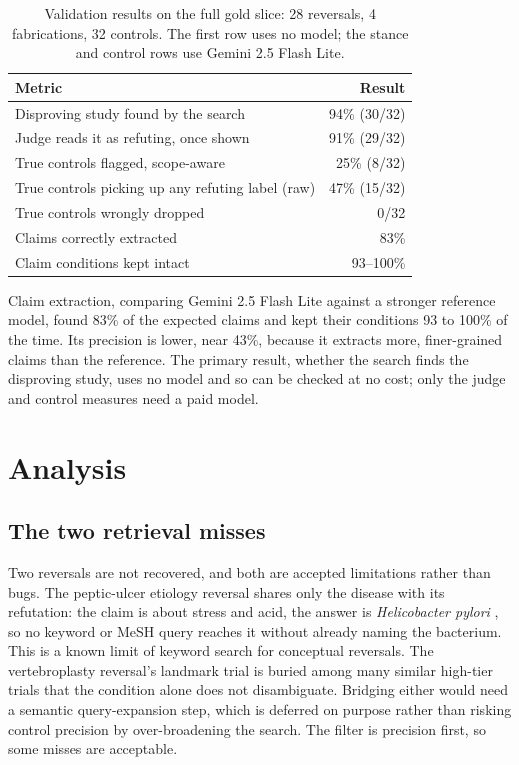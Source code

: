 \documentclass[11pt,a4paper]{article}
\begin{document}
\begin{table}[h]
\centering
\begin{tabular}{lr}
\toprule
\textbf{Metric} & \textbf{Result} \\
\midrule
Disproving study found by the search & 94\% (30/32) \\
Judge reads it as refuting, once shown & 91\% (29/32) \\
True controls flagged, scope-aware & 25\% (8/32) \\
True controls picking up any refuting label (raw) & 47\% (15/32) \\
True controls wrongly dropped & 0/32 \\
Claims correctly extracted & 83\% \\
Claim conditions kept intact & 93--100\% \\
\bottomrule
\end{tabular}
\caption{Validation results on the full gold slice: 28 reversals, 4 fabrications, 32 controls. The first row uses no model; the stance and control rows use Gemini 2.5 Flash Lite.}
\label{tab:results}
\end{table}

Claim extraction, comparing Gemini 2.5 Flash Lite against a stronger reference model, found 83\% of the expected claims and kept their conditions 93 to 100\% of the time. Its precision is lower, near 43\%, because it extracts more, finer-grained claims than the reference. The primary result, whether the search finds the disproving study, uses no model and so can be checked at no cost; only the judge and control measures need a paid model.

\section{Analysis}

\subsection{The two retrieval misses}

Two reversals are not recovered, and both are accepted limitations rather than bugs. The peptic-ulcer etiology reversal shares only the disease with its refutation: the claim is about stress and acid, the answer is \emph{Helicobacter pylori} \citep{marshall1984}, so no keyword or MeSH query reaches it without already naming the bacterium. This is a known limit of keyword search for conceptual reversals. The vertebroplasty reversal's landmark trial is buried among many similar high-tier trials that the condition alone does not disambiguate. Bridging either would need a semantic query-expansion step, which is deferred on purpose rather than risking control precision by over-broadening the search. The filter is precision first, so some misses are acceptable.
\end{document}
